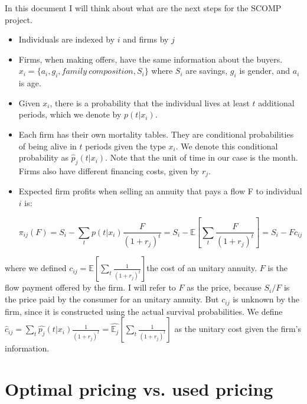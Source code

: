 \documentclass[12pt]{article}
\theoremstyle{plain}
\theoremstyle{plain}
\begin{document}
  

In this document I will think about what are the next steps for the
SCOMP project. 


\begin{itemize}
    \item Individuals are indexed by $i$ and firms by $j$ 
    \item Firms, when making offers, have the same information about the buyers.\\
    $x_{i}=\{a_i,g_i,family \  composition,S_{i}\}$ where $S_{i}$ are savings, $g_i$ is gender, and $a_i$ is age. 
    \item Given $x_{i}$, there is a probability that the individual lives at least $t$ additional periods, which we denote by $p(t|x_{i})$. 
    \item Each firm has their own mortality tables. They are conditional probabilities of being alive in $t$ periods given the type $x_{i}.$ We denote this conditional probability as $\hat{p}_{j}(t|x_{i})$.
    Note that the unit of time in our case is the month. Firms also have different financing costs, given by $r_{j}$. 

    \item Expected firm profits when selling an annuity that pays a flow F to individual $i$ is: 

\begin{equation}\label{eq:profit}
\pi_{ij}(F)=S_{i}-\sum_{t}p(t|x_{i})\frac{F}{(1+r_{j})^{t}}=S_{i}-\mathbb{E}\left[\sum_{t}\frac{F}{(1+r_{j})^{t}}\right]=S_{i}-Fc_{ij}
\end{equation}
\end{itemize}

where we defined $c_{ij}=\mathbb{E}\left[\sum_{t}\frac{1}{(1+r_{j})^{t}}\right]$the
cost of an unitary annuity. $F$ is the flow payment offered by the firm. I will refer to $F$ as the price, because
$S_{i}/F$ is the price paid by the consumer for an unitary annuity.
But $c_{ij}$ is unknown by the firm, since it is constructed using the
actual survival probabilities. We define $\hat{c}_{ij}=\sum_{t}\hat{p_{j}}(t|x_{i})\frac{1}{(1+r_{j})^{t}}=\hat{\mathbb{E}_{j}}\left[\sum_{t}\frac{1}{(1+r_{j})^{t}}\right]$
as the unitary cost given the firm's information.



\section{Optimal pricing vs. used pricing}
\end{document}
